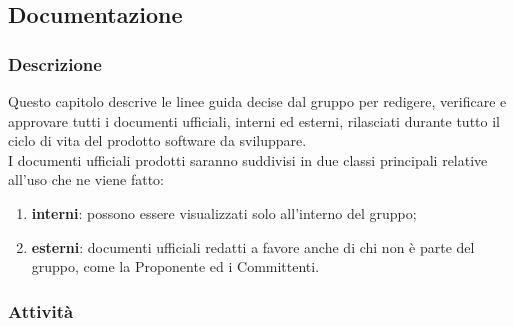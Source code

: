 \subsection{Documentazione}

	\subsubsection{Descrizione}
	Questo capitolo descrive le linee guida decise dal gruppo per redigere, verificare e approvare tutti i documenti ufficiali, interni ed esterni, rilasciati durante tutto il ciclo di vita del prodotto software da sviluppare.\\
	I documenti ufficiali prodotti saranno suddivisi in due classi principali relative all'uso che ne viene fatto:
	\begin{enumerate}
		\item \textbf{interni}: possono essere visualizzati solo all'interno del gruppo;
		\item \textbf{esterni}: documenti ufficiali redatti a favore anche di chi non è parte del gruppo, come la Proponente ed i Committenti.
	\end{enumerate}
	
	\subsubsection{Attività}

